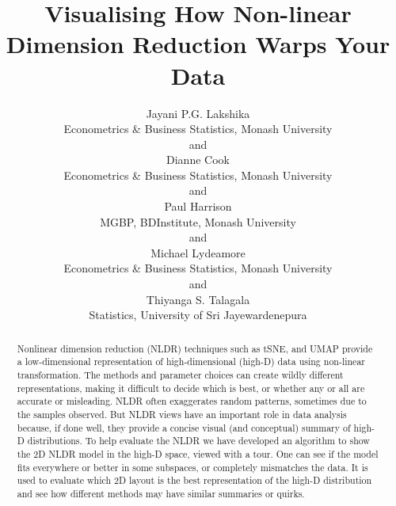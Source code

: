 \documentclass[
  12pt]{article}
\begin{document}
\def\spacingset#1{\renewcommand{\baselinestretch}%
{#1}\small\normalsize} \spacingset{1}


\title{\bf Visualising How Non-linear Dimension Reduction Warps Your
Data}
\author{
Jayani P.G. Lakshika\\
Econometrics \& Business Statistics, Monash University\\
and\\Dianne Cook\\
Econometrics \& Business Statistics, Monash University\\
and\\Paul Harrison\\
MGBP, BDInstitute, Monash University\\
and\\Michael Lydeamore\\
Econometrics \& Business Statistics, Monash University\\
and\\Thiyanga S. Talagala\\
Statistics, University of Sri Jayewardenepura\\
}
\maketitle

\bigskip
\bigskip
\begin{abstract}
Nonlinear dimension reduction (NLDR) techniques such as tSNE, and UMAP
provide a low-dimensional representation of high-dimensional (high-D)
data using non-linear transformation. The methods and parameter choices
can create wildly different representations, making it difficult to
decide which is best, or whether any or all are accurate or misleading.
NLDR often exaggerates random patterns, sometimes due to the samples
observed. But NLDR views have an important role in data analysis
because, if done well, they provide a concise visual (and conceptual)
summary of high-D distributions. To help evaluate the NLDR we have
developed an algorithm to show the 2D NLDR model in the high-D space,
viewed with a tour. One can see if the model fits everywhere or better
in some subspaces, or completely mismatches the data. It is used to
evaluate which 2D layout is the best representation of the high-D
distribution and see how different methods may have similar summaries or
quirks.
\end{abstract}
\end{document}
